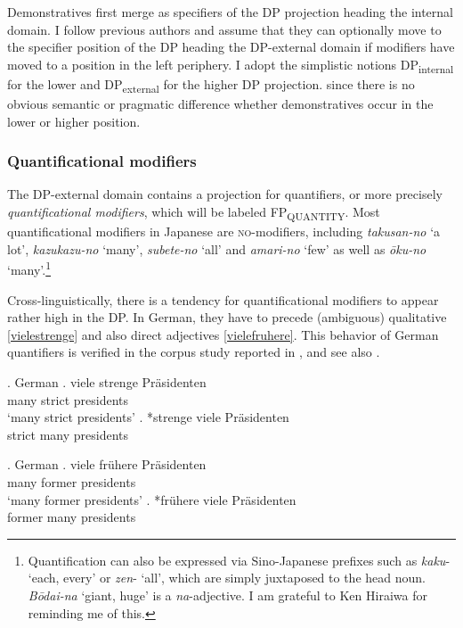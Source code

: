 \documentclass [output=book,colorlinks,citecolor=brown]{langscibook}
\begin{document}
Demonstratives first merge as specifiers of the DP projection heading the internal domain. I follow previous authors \citep{laenzlinger:2011:elements, kim:2019:syntax} and assume that they can optionally move to the specifier position of the DP heading the DP-external domain if modifiers have moved to a position in the left periphery. I adopt the simplistic notions DP\textsubscript{internal} for the lower and DP\textsubscript{external} for the higher DP projection. since there is no obvious semantic or pragmatic difference whether demonstratives occur in the lower or higher position.

\subsubsection{Quantificational modifiers} \label{quantificational modifiers}

The DP-external domain contains a projection for quantifiers, or more precisely \textit{quantificational modifiers}, which will be labeled FP\textsubscript{QUANTITY}. Most quantificational modifiers in Japanese are \textsc{no}-modifiers, including \textit{takusan-no} `a lot’, \textit{kazukazu-no} `many', \textit{subete-no} `all' and \textit{amari-no} `few' as well as \textit{ōku-no} `many’.\footnote{Quantification can also be expressed via Sino-Japanese prefixes such as \textit{kaku}- `each, every' or \textit{zen}- `all’, which are simply juxtaposed to the head noun. \textit{Bōdai-na} `giant, huge’ is a \textit{na}-adjective. I am grateful to Ken Hiraiwa for reminding me of this.}

Cross-linguistically, there is a tendency for quantificational modifiers to appear rather high in the DP. In German, they have to precede (ambiguous) qualitative \ref{vielestrenge} and also direct adjectives \ref{vielefruhere}. This behavior of German quantifiers is verified in the corpus study reported in \citet[378]{trost:2006:das}, and see also \citet{eichinger:1991:ganz}. %

\ex. \label{vielestrenge} German
 \ag. viele strenge Präsidenten\\
many strict presidents\\
`many strict presidents’
\bg. *strenge viele Präsidenten\\
strict many presidents\\

\newpage

\ex. \label{vielefruhere} German
 \ag. viele frühere Präsidenten\\
many former presidents\\
`many former presidents’
\bg. *frühere viele Präsidenten\\
former many presidents\\
\end{document}
